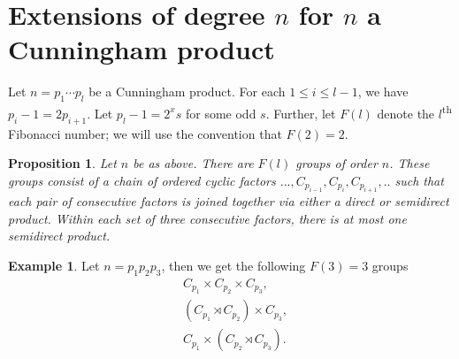 \documentclass[a4paper,reqno]{amsart}
\newtheorem{proposition}[theorem]{Proposition}
\theoremstyle{definition}
\newtheorem{example}[theorem]{Example}
\begin{document}
\section{Extensions of degree \texorpdfstring{$n$}{n} for \texorpdfstring{$n$}{n} a Cunningham product}
Let $n=p_1\cdots p_l$ be a Cunningham product. For each $1\leq i \leq l-1$, we have $p_i-1=2p_{i+1}$. Let $p_l-1=2^xs$ for some odd $s$. Further, let $F(l)$ denote the $l$\textsuperscript{th} Fibonacci number; we will use the convention that $F(2)=2$.
\begin{proposition}\label{fibbonacci}
    Let $n$ be as above. There are $F(l)$ groups of order $n$. These groups consist of a chain of ordered cyclic factors $..., C_{p_{i-1}}, C_{p_i}, C_{p_{i+1}},..$ such that each pair of consecutive factors is joined together via either a direct or semidirect product. Within each set of three consecutive factors, there is at most one semidirect product.
\end{proposition}
\begin{example}\label{fib_3_example}
    Let $n=p_1p_2p_3$, then we get the following $F(3)=3$ groups
    \begin{align*}
	& C_{p_1} \times C_{p_2} \times C_{p_3},\\
	& (C_{p_1} \rtimes C_{p_2}) \times C_{p_3},\\
	& C_{p_1} \times (C_{p_2} \rtimes C_{p_3}).
    \end{align*}
\end{example}
\end{document}
